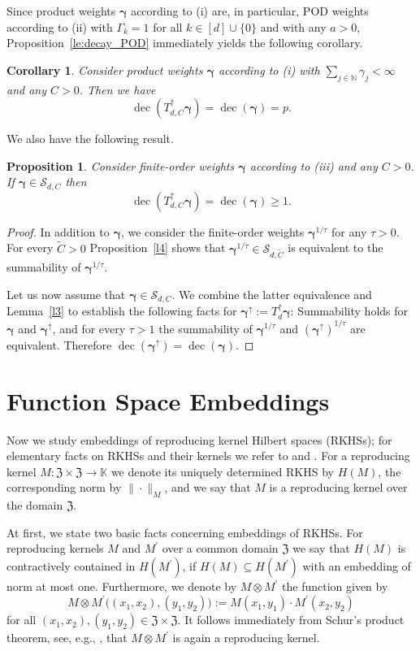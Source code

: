\documentclass{article}
\newcommand{\N}  {{\mathbb N}}
\newcommand{\K}  {{\mathbb K}}
\newcommand{\bg}{{\boldsymbol{\gamma}}}
\newcommand{\Z}{{\mathfrak Z}}
\newcommand{\SSS}{\mathcal{S}}
\newcommand{\up}{\uparrow}
\DeclareMathOperator{\decay}{dec}
\theoremstyle{plain}
\newtheorem{corollary}{Corollary}
\newtheorem{prop}{Proposition}
\theoremstyle{definition}
\begin{document}
Since product weights $\bg$ according to (i) are, in particular, POD 
weights according to (ii) with $\Gamma_k = 1$ for all $k\in [d]
\cup \{0\}$ and with any $a > 0$,
Proposition~\ref{le:decay_POD}
immediately yields the following corollary.


\begin{corollary}\label{le:decay_prod}
Consider product weights $\bg$ according to (i)
with $\sum_{j \in \N} \gamma_j < \infty$ and any $C>0$.
Then we have
\[
\decay \left(T^{\up}_{d,C} \bg\right) = \decay (\bg) = p.
\]
\end{corollary}

We also have the following result.

\begin{prop}\label{le:decay_FO}
Consider finite-order weights $\bg$ according to 
(iii) and any $C > 0$. If $\bg \in \SSS_{d,C}$ then
\[
 \decay \left(T^{\up}_{d,C} \bg \right) =\decay (\bg)
 \ge 1.
\]
\end{prop}

\begin{proof}
In addition to $\bg$, we consider the finite-order weights 
$\bg^{1/\tau}$ for any $\tau > 0$.
For every $\widetilde{C}>0$ Proposition~\ref{l4} shows that 
$\bg^{1/\tau} \in \SSS_{d,\widetilde{C}}$ is equivalent to the
summability of $\bg^{1/\tau}$.

Let us now assume that $\bg \in \SSS_{d,C}$. 
We combine the latter equivalence and Lemma~\ref{l3} to
establish the following facts for $\bg^\up := T^\up_d \bg$: 
Summability holds for $\bg$ and
$\bg^\up$, and for every $\tau>1$ the summability of $\bg^{1/\tau}$
and $\left(\bg^\up\right)^{1/\tau}$ are equivalent.
Therefore $\decay(\bg^\up) = \decay(\bg)$.
\end{proof}



\section{Function Space Embeddings}\label{Sec:Embeddings}


Now we study embeddings of reproducing kernel Hilbert spaces
(RKHSs); for elementary facts on RKHSs and 
their kernels we refer to \citet{Aro50} 
and \citet{PR16}. For a reproducing kernel $M \colon \Z
\times \Z \to \K$ we 
denote its uniquely determined RKHS by
$H(M)$, the corresponding norm by $\|\cdot\|_{M}$,
and we say that $M$ is a reproducing kernel over the domain $\Z$.

At first, we state two basic facts concerning embeddings of RKHSs.
For reproducing kernels $M$ and $M^\prime$ over a common domain $\Z$
we say that $H(M)$ is contractively contained in $H(M^\prime)$,
if $H(M) \subseteq H(M^\prime)$ with an embedding of norm at most
one. 
Furthermore, we denote by $M \otimes M^{\prime}$ the function
given by 
\[
M \otimes M^{\prime} \big( (x_1, x_2), (y_1, y_2) \big) :=
M(x_1, y_1) \cdot  M^{\prime} (x_2, y_2)
\]
for all $(x_1, x_2), (y_1, y_2) \in \Z\times \Z$.
It follows immediately from Schur's product theorem,
see, e.g., \citet[Thm.~4.8]{PR16}, that 
$M \otimes M^{\prime}$ is again a reproducing kernel.
\end{document}
